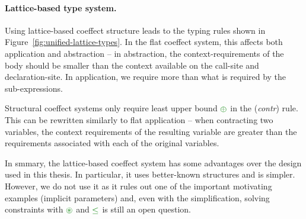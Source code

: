 
\paragraph{Lattice-based type system.}

Using lattice-based coeffect structure leads to the typing rules shown in Figure~\ref{fig:unified-lattice-types}.
In the flat coeffect system, this affects both application and abstraction -- in abstraction,
the context-requirements of the body should be smaller than the context available on the 
call-site and declaration-site. In application, we require more than what is required by
the sub-expressions.

Structural coeffect systems only require least upper bound $\cpar$ in the (\emph{contr}) rule.
This can be rewritten similarly to flat application --  when contracting two variables, the
context requirements of the resulting variable are greater than the requirements associated with
each of the original variables.

In smmary, the lattice-based coeffect system has some advantages over the design used in this
thesis. In particular, it uses better-known structures and is simpler. However, we do not use
it as it rules out one of the important motivating examples (implicit parameters) and, even with
the simplification, solving constraints with $\cseq$ and $\cleq$ is still an open question.


%                                                                                             


